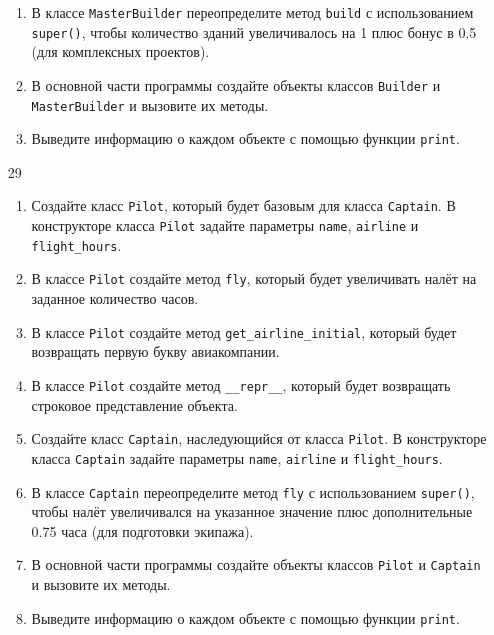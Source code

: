 \begin{enumerate}
\begin{enumerate}[leftmargin=*]
    \item В классе \texttt{MasterBuilder} переопределите метод \texttt{build} с использованием \texttt{super()}, чтобы количество зданий увеличивалось на 1 плюс бонус в 0.5 (для комплексных проектов).
    
    \item В основной части программы создайте объекты классов \texttt{Builder} и \texttt{MasterBuilder} и вызовите их методы.
    
    \item Выведите информацию о каждом объекте с помощью функции \texttt{print}.
\end{enumerate}

\item[29] 
\begin{enumerate}[leftmargin=*]
    \item Создайте класс \texttt{Pilot}, который будет базовым для класса \texttt{Captain}. В конструкторе класса \texttt{Pilot} задайте параметры \texttt{name}, \texttt{airline} и \texttt{flight\_hours}.
    
    \item В классе \texttt{Pilot} создайте метод \texttt{fly}, который будет увеличивать налёт на заданное количество часов.
    
    \item В классе \texttt{Pilot} создайте метод \texttt{get\_airline\_initial}, который будет возвращать первую букву авиакомпании.
    
    \item В классе \texttt{Pilot} создайте метод \texttt{\_\_repr\_\_}, который будет возвращать строковое представление объекта.
    
    \item Создайте класс \texttt{Captain}, наследующийся от класса \texttt{Pilot}. В конструкторе класса \texttt{Captain} задайте параметры \texttt{name}, \texttt{airline} и \texttt{flight\_hours}.
    
    \item В классе \texttt{Captain} переопределите метод \texttt{fly} с использованием \texttt{super()}, чтобы налёт увеличивался на указанное значение плюс дополнительные 0.75 часа (для подготовки экипажа).
    
    \item В основной части программы создайте объекты классов \texttt{Pilot} и \texttt{Captain} и вызовите их методы.
    
    \item Выведите информацию о каждом объекте с помощью функции \texttt{print}.
\end{enumerate}


\end{enumerate}

